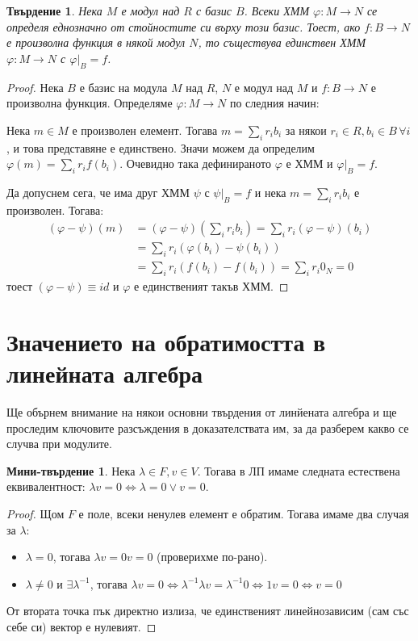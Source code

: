 \documentclass{article}
\newif\ifusemulticols
\theoremstyle{definition}
\newtheorem{miniprop}{Мини-твърдение}[section]
\theoremstyle{remark}
\theoremstyle{plain}
\theoremstyle{plain}
\newtheorem{prop}[theorem]{Твърдение}
\newenvironment{mymulticols}
    { \ifusemulticols \begin{multicols}{2} \fi }
    { \ifusemulticols \end{multicols} \fi }
\begin{document}
\begin{mymulticols}
\begin{prop}
    \label{prop:homomorphism_univer_prop}
    Нека $M$ е модул над $R$ с базис $B$. Всеки ХММ $\varphi : M \to N$ се определя еднозначно от стойностите си върху този базис. Тоест, ако $f : B \to N$ е произволна функция в някой модул $N$, то съществува единствен ХММ $\varphi : M \to N$ с $\varphi\big|_B = f$.
\end{prop}

\begin{proof}
    Нека $B$ е базис на модула $M$ над $R$, $N$ е модул над $M$ и $f : B \to N$ е произволна функция.
    Определяме $\varphi : M \to N$ по следния начин:

    Нека $m \in M$ е произволен елемент. Тогава $m = \sum_i r_i b_i$ за някои $r_i \in R, b_i \in B \, \forall i$, и това представяне е единствено. Значи можем да определим $\varphi(m) = \sum_i r_i f(b_i)$.
    Очевидно така дефинираното $\varphi$ е ХММ и $\varphi\big|_B=f$.

    Да допуснем сега, че има друг ХММ $\psi$ с $\psi\big|_B=f$ и нека $m = \sum_i r_i b_i$ е произволен.
    Тогава:
    \begin{align*}
        (\varphi-\psi)(m) &= (\varphi - \psi)\left(\sum_i r_i b_i\right)
                            = \sum_i r_i (\varphi - \psi)(b_i)\\
                          &= \sum_i r_i (\varphi(b_i) - \psi(b_i))\\
                          &= \sum_i r_i (f(b_i) - f(b_i)) = \sum_i r_i 0_N = 0
    \end{align*}
    тоест $(\varphi-\psi) \equiv id$ и $\varphi$ е единственият такъв ХММ.
\end{proof}

\section{Значението на обратимостта в линейната алгебра}

Ще обърнем внимание на някои основни твърдения от линйената алгебра и ще проследим ключовите
разсъждения в доказателствата им, за да разберем какво се случва при модулите.

\begin{miniprop}
    Нека $\lambda \in F, v \in V$. Тогава в ЛП имаме следната естествена еквивалентност:
    $\lambda v = 0 \Leftrightarrow \lambda=0 \lor v = 0$.
\end{miniprop}

\begin{proof}
    Щом $F$ е поле, всеки ненулев елемент е обратим. Тогава имаме два случая за $\lambda$:
    \begin{itemize}
        \item $\lambda = 0$, тогава $\lambda v = 0v = 0$ (проверихме по-рано).
        \item $\lambda \neq 0$ и $\exists \lambda^{-1}$, тогава $\lambda v = 0
            \Leftrightarrow \lambda^{-1}\lambda v = \lambda^{-1}0 \Leftrightarrow
            1v=0 \Leftrightarrow v=0$
    \end{itemize}
    От втората точка пък директно излиза, че единственият линейнозависим (сам със себе си)
    вектор е нулевият.


\end{proof}
\end{mymulticols}
\end{document}
